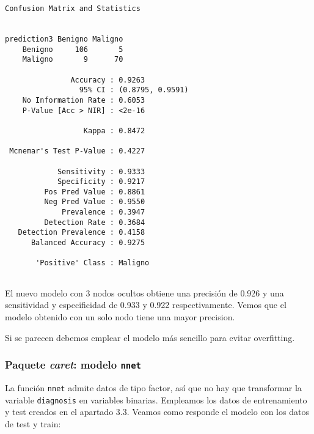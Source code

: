 \documentclass[
]{article}
\begin{document}
\begin{verbatim}
Confusion Matrix and Statistics

           
prediction3 Benigno Maligno
    Benigno     106       5
    Maligno       9      70
                                          
               Accuracy : 0.9263          
                 95% CI : (0.8795, 0.9591)
    No Information Rate : 0.6053          
    P-Value [Acc > NIR] : <2e-16          
                                          
                  Kappa : 0.8472          
                                          
 Mcnemar's Test P-Value : 0.4227          
                                          
            Sensitivity : 0.9333          
            Specificity : 0.9217          
         Pos Pred Value : 0.8861          
         Neg Pred Value : 0.9550          
             Prevalence : 0.3947          
         Detection Rate : 0.3684          
   Detection Prevalence : 0.4158          
      Balanced Accuracy : 0.9275          
                                          
       'Positive' Class : Maligno         
                                          
\end{verbatim}

El nuevo modelo con 3 nodos ocultos obtiene una precisión de 0.926 y una
sensitividad y especificidad de 0.933 y 0.922 respectivamente. Vemos que
el modelo obtenido con un solo nodo tiene una mayor precision.

Si se parecen debemos emplear el modelo más sencillo para evitar
overfitting.

\hypertarget{paquete-caret-modelo-nnet}{%
\subsubsection{\texorpdfstring{Paquete \emph{caret}: modelo
\texttt{nnet}}{Paquete caret: modelo nnet}}\label{paquete-caret-modelo-nnet}}

La función \texttt{nnet} admite datos de tipo factor, así que no hay que
transformar la variable \texttt{diagnosis} en variables binarias.
Empleamos los datos de entrenamiento y test creados en el apartado 3.3.
Veamos como responde el modelo con los datos de test y train:
\end{document}
